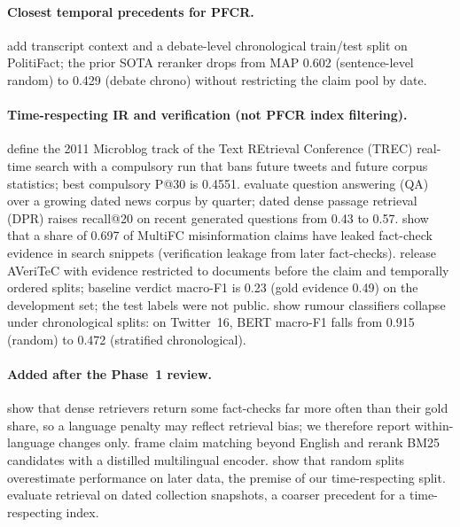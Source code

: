 \documentclass[11pt]{article}
\begin{document}
\paragraph{Closest temporal precedents for PFCR.}
 add transcript context and a debate-level chronological train/test split on PolitiFact; the prior SOTA reranker drops from MAP 0.602 (sentence-level random) to 0.429 (debate chrono) without restricting the claim pool by date.

\paragraph{Time-respecting IR and verification (not PFCR index filtering).}
 define the 2011 Microblog track of the Text REtrieval Conference (TREC) real-time search with a compulsory run that bans future tweets and future corpus statistics; best compulsory P@30 is 0.4551.
 evaluate question answering (QA) over a growing dated news corpus by quarter; dated dense passage retrieval (DPR) raises recall@20 on recent generated questions from 0.43 to 0.57.
 show that a share of 0.697 of MultiFC misinformation claims have leaked fact-check evidence in search snippets (verification leakage from later fact-checks).
 release AVeriTeC with evidence restricted to documents before the claim and temporally ordered splits; baseline verdict macro-F1 is 0.23 (gold evidence 0.49) on the development set; the test labels were not public.
 show rumour classifiers collapse under chronological splits: on Twitter~16, BERT macro-F1 falls from 0.915 (random) to 0.472 (stratified chronological).

\paragraph{Added after the Phase~1 review.}
 show that dense retrievers return some fact-checks far more often than their gold share, so a language penalty may reflect retrieval bias; we therefore report within-language changes only.
 frame claim matching beyond English and rerank BM25 candidates with a distilled multilingual encoder.
 show that random splits overestimate performance on later data, the premise of our time-respecting split.
 evaluate retrieval on dated collection snapshots, a coarser precedent for a time-respecting index.
\end{document}

